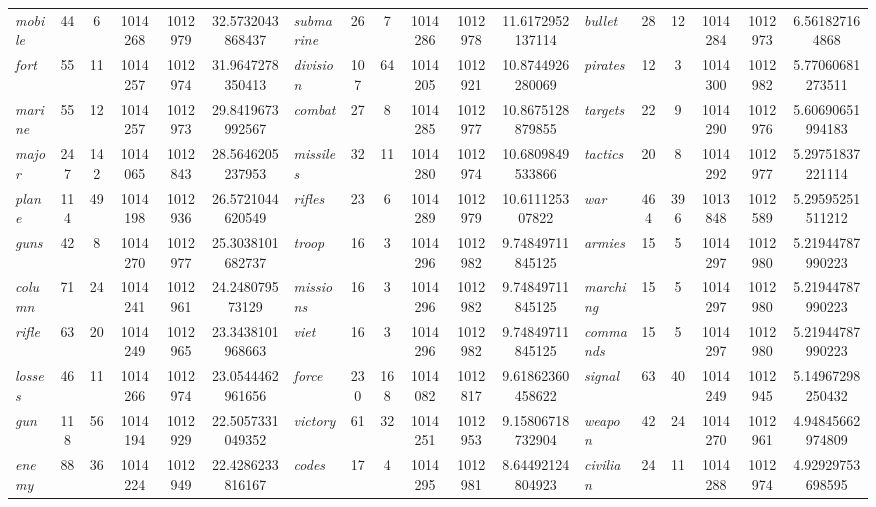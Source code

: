\begin{table}
{\begin{tabular}{l *{2}{S[table-format=4]} *{2}{S[table-format=8]} Sl *{2}{S[table-format=4]} *{2}{S[table-format=8]} Sl *{2}{S[table-format=2]} *{2}{S[table-format=8]} S}
\textit{mobile} & 44 & 6 & 1014268 & 1012979 & 32.5732043868437 & \textit{submarine} & 26 & 7 & 1014286 & 1012978 & 11.6172952137114 & \textit{bullet} & 28 & 12 & 1014284 & 1012973 & 6.561827164868 \\
\textit{fort} & 55 & 11 & 1014257 & 1012974 & 31.9647278350413 & \textit{division} & 107 & 64 & 1014205 & 1012921 & 10.8744926280069 & \textit{pirates} & 12 & 3 & 1014300 & 1012982 & 5.77060681273511 \\
\textit{marine} & 55 & 12 & 1014257 & 1012973 & 29.8419673992567 & \textit{combat} & 27 & 8 & 1014285 & 1012977 & 10.8675128879855 & \textit{targets} & 22 & 9 & 1014290 & 1012976 & 5.60690651994183 \\
\textit{major} & 247 & 142 & 1014065 & 1012843 & 28.5646205237953 & \textit{missiles} & 32 & 11 & 1014280 & 1012974 & 10.6809849533866 & \textit{tactics} & 20 & 8 & 1014292 & 1012977 & 5.29751837221114 \\
\textit{plane} & 114 & 49 & 1014198 & 1012936 & 26.5721044620549 & \textit{rifles} & 23 & 6 & 1014289 & 1012979 & 10.611125307822 & \textit{war} & 464 & 396 & 1013848 & 1012589 & 5.29595251511212 \\
\textit{guns} & 42 & 8 & 1014270 & 1012977 & 25.3038101682737 & \textit{troop} & 16 & 3 & 1014296 & 1012982 & 9.74849711845125 & \textit{armies} & 15 & 5 & 1014297 & 1012980 & 5.21944787990223 \\
\textit{column} & 71 & 24 & 1014241 & 1012961 & 24.248079573129 & \textit{missions} & 16 & 3 & 1014296 & 1012982 & 9.74849711845125 & \textit{marching} & 15 & 5 & 1014297 & 1012980 & 5.21944787990223 \\
\textit{rifle} & 63 & 20 & 1014249 & 1012965 & 23.3438101968663 & \textit{viet} & 16 & 3 & 1014296 & 1012982 & 9.74849711845125 & \textit{commands} & 15 & 5 & 1014297 & 1012980 & 5.21944787990223 \\
\textit{losses} & 46 & 11 & 1014266 & 1012974 & 23.0544462961656 & \textit{force} & 230 & 168 & 1014082 & 1012817 & 9.61862360458622 & \textit{signal} & 63 & 40 & 1014249 & 1012945 & 5.14967298250432 \\
\textit{gun} & 118 & 56 & 1014194 & 1012929 & 22.5057331049352 & \textit{victory} & 61 & 32 & 1014251 & 1012953 & 9.15806718732904 & \textit{weapon} & 42 & 24 & 1014270 & 1012961 & 4.94845662974809 \\
\textit{enemy} & 88 & 36 & 1014224 & 1012949 & 22.4286233816167 & \textit{codes} & 17 & 4 & 1014295 & 1012981 & 8.64492124804923 & \textit{civilian} & 24 & 11 & 1014288 & 1012974 & 4.92929753698595 \\

\end{tabular}}
\end{table}
